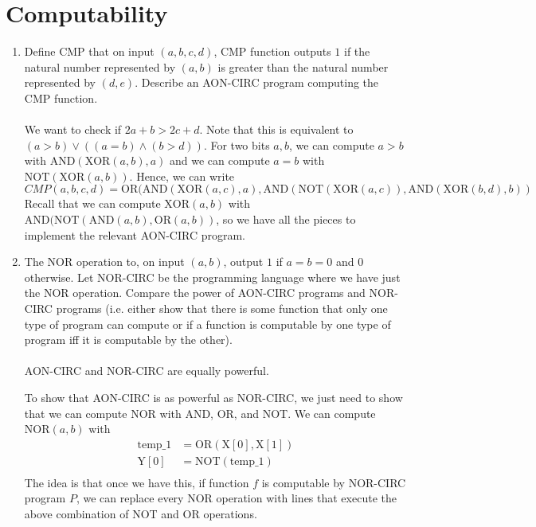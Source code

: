\documentclass[11pt]{article}
\theoremstyle{definition}
\theoremstyle{remark}
\providecommand{\tightlist}{%
  \setlength{\itemsep}{0pt}\setlength{\parskip}{0pt}}
\begin{document}
\section{Computability}

\begin{enumerate}
\tightlist
\item Define CMP that on input $(a,b,c,d)$, CMP function outputs $1$ if the natural number represented by $(a,b)$ is greater than the natural number represented by $(d,e)$. Describe an AON-CIRC program computing the CMP function. \\\\
We want to check if $2 a + b > 2 c + d$. Note that this is equivalent to $(a > b) \lor ((a = b) \land (b > d))$. For two bits $a, b$, we can compute $a > b$ with $\text{AND}(\text{XOR}(a,b), a)$ and we can compute $a = b$ with $\text{NOT}(\text{XOR}(a,b))$. Hence, we can write
$$CMP(a,b,c,d) = \text{OR}(\text{AND}(\text{XOR}(a,c), a), \text{AND}(\text{NOT}(\text{XOR}(a,c)), \text{AND}(\text{XOR}(b,d), b)) $$
Recall that we can compute $\text{XOR}(a,b)$ with $\text{AND}(\text{NOT}(\text{AND}(a,b), \text{OR}(a,b))$, so we have all the pieces to implement the relevant AON-CIRC program.
\\
\item The NOR operation to, on input $(a,b)$, output $1$ if $a=b=0$ and $0$ otherwise. Let NOR-CIRC be the programming
language where we have just the NOR operation. Compare the power
of AON-CIRC programs and NOR-CIRC programs (i.e. either show that there is some function that only one type of program can compute or if a function is computable by one type of program iff it is computable by the other).
\\\\
AON-CIRC and NOR-CIRC are equally powerful.

\vspace{5pt}
To show that AON-CIRC is as powerful as NOR-CIRC, we just need to show that we can compute NOR with AND, OR, and NOT. We can compute $\text{NOR}(a,b)$ with 
$$\begin{aligned}
\text{temp\_1} &= \text{OR}(\text{X}[0],\text{X}[1]) \\
\text{Y}[0] &= \text{NOT}(\text{temp\_1}) \\
\end{aligned}$$
The idea is that once we have this, if function $f$ is computable by NOR-CIRC program $P$, we can replace every NOR operation with lines that execute the above combination of NOT and OR operations.


\end{enumerate}
\end{document}
